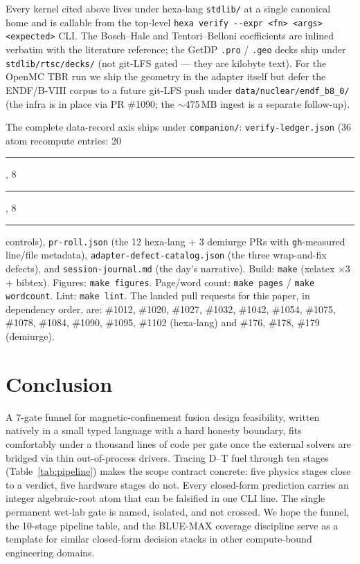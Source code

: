 \documentclass[11pt,a4paper]{article}
\newcommand{\tierdisc}[1]{\textcolor{#1}{\rule[0.05ex]{1.0ex}{1.0ex}}}
\newcommand{\tierBlue}{\tierdisc{blue!70!black}}
\newcommand{\tierGreen}{\tierdisc{green!60!black}}
\newcommand{\tierRed}{\tierdisc{red!80!black}}
\begin{document}
Every kernel cited above lives under hexa-lang \verb|stdlib/| at a
single canonical home and is callable from the top-level
\verb|hexa verify --expr <fn> <args> <expected>| CLI. The Bosch--Hale
and Tentori--Belloni coefficients are inlined verbatim with the
literature reference; the GetDP \verb|.pro| / \verb|.geo| decks ship
under \verb|stdlib/rtsc/decks/| (not git-LFS gated --- they are
kilobyte text). For the OpenMC TBR run we ship the geometry in the
adapter itself but defer the ENDF/B-VIII corpus to a future git-LFS
push under \verb|data/nuclear/endf_b8_0/| (the infra is in place via
PR \#1090; the $\sim$475\,MB ingest is a separate follow-up).

\smallskip\noindent
The complete data-record axis ships under \texttt{companion/}:
\texttt{verify-ledger.json} (36 atom recompute entries: 20 \tierGreen,
8 \tierBlue, 8 \tierRed controls),
\texttt{pr-roll.json} (the 12 hexa-lang + 3 demiurge PRs with
\texttt{gh}-measured line/file metadata),
\texttt{adapter-defect-catalog.json} (the three wrap-and-fix defects),
and \texttt{session-journal.md} (the day's narrative). Build:
\texttt{make} (xelatex $\times 3$ + bibtex). Figures:
\texttt{make figures}. Page/word count: \texttt{make pages} /
\texttt{make wordcount}. Lint: \texttt{make lint}.
The landed pull requests for this paper, in dependency order, are:
\#1012, \#1020, \#1027, \#1032, \#1042, \#1054, \#1075, \#1078,
\#1084, \#1090, \#1095, \#1102 (hexa-lang) and \#176, \#178, \#179
(demiurge).

\section{Conclusion}
\label{sec:conclusion}

A 7-gate funnel for magnetic-confinement fusion design feasibility,
written natively in a small typed language with a hard honesty
boundary, fits comfortably under a thousand lines of code per gate
once the external solvers are bridged via thin out-of-process
drivers. Tracing D--T fuel through ten stages
(Table~\ref{tab:pipeline}) makes the scope contract concrete: five
physics stages close to a verdict, five hardware stages do not. Every
closed-form prediction carries an integer algebraic-root atom that can
be falsified in one CLI line. The single permanent wet-lab gate is
named, isolated, and not crossed. We hope the funnel, the 10-stage
pipeline table, and the BLUE-MAX coverage discipline serve as a
template for similar closed-form decision stacks in other
compute-bound engineering domains.
\end{document}
